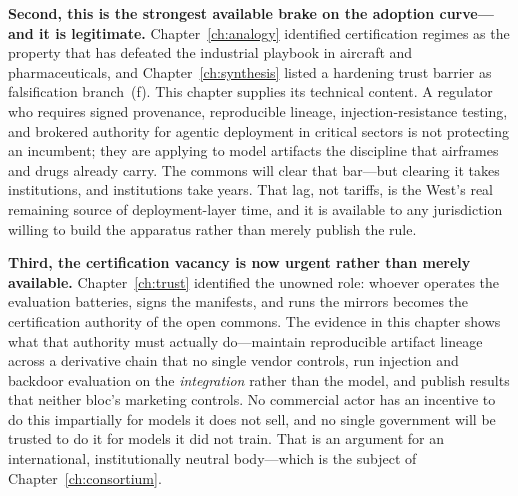 \textbf{Second, this is the strongest available brake on the adoption curve---and it is legitimate.} Chapter~\ref{ch:analogy} identified certification regimes as the property that has defeated the industrial playbook in aircraft and pharmaceuticals, and Chapter~\ref{ch:synthesis} listed a hardening trust barrier as falsification branch~(f). This chapter supplies its technical content. A regulator who requires signed provenance, reproducible lineage, injection-resistance testing, and brokered authority for agentic deployment in critical sectors is not protecting an incumbent; they are applying to model artifacts the discipline that airframes and drugs already carry. The commons will clear that bar---but clearing it takes institutions, and institutions take years. That lag, not tariffs, is the West's real remaining source of deployment-layer time, and it is available to any jurisdiction willing to build the apparatus rather than merely publish the rule.

\textbf{Third, the certification vacancy is now urgent rather than merely available.} Chapter~\ref{ch:trust} identified the unowned role: whoever operates the evaluation batteries, signs the manifests, and runs the mirrors becomes the certification authority of the open commons. The evidence in this chapter shows what that authority must actually do---maintain reproducible artifact lineage across a derivative chain that no single vendor controls, run injection and backdoor evaluation on the \emph{integration} rather than the model, and publish results that neither bloc's marketing controls. No commercial actor has an incentive to do this impartially for models it does not sell, and no single government will be trusted to do it for models it did not train. That is an argument for an international, institutionally neutral body---which is the subject of Chapter~\ref{ch:consortium}.
